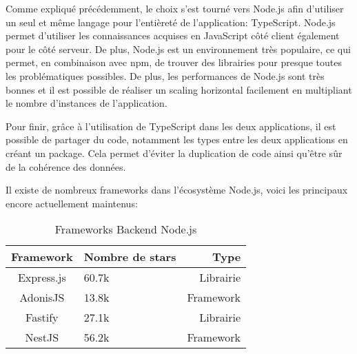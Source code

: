 Comme expliqué précédemment, le choix s'est tourné vers Node.js \cite{nodejs} afin d'utiliser un seul et même langage pour l'entièreté de l'application: TypeScript. Node.js permet d'utiliser les connaissances acquises en JavaScript côté client également pour le côté serveur. De plus, Node.js est un environnement très populaire, ce qui permet, en combinaison avec \Gls{npm}, de trouver des librairies pour presque toutes les problématiques possibles. De plus, les performances de Node.js sont très bonnes et il est possible de réaliser un scaling horizontal facilement en multipliant le nombre d'instances de l'application.

Pour finir, grâce à l'utilisation de TypeScript dans les deux applications, il est possible de partager du code, notamment les types entre les deux applications en créant un package. Cela permet d'éviter la duplication de code ainsi qu'être sûr de la cohérence des données.

Il existe de nombreux frameworks dans l'écosystème Node.js, voici les principaux encore actuellement maintenus:

\begin{table}[h]
  \begin{center}
    \caption{Frameworks Backend Node.js}
    \begin{tabular}{c|l|r}
      Framework  & Nombre de stars & Type      \\ \hline
      Express.js & 60.7k           & Librairie \\
      AdonisJS   & 13.8k           & Framework \\
      Fastify    & 27.1k           & Librairie \\
      NestJS     & 56.2k           & Framework \\
    \end{tabular}
  \end{center}
\end{table}

